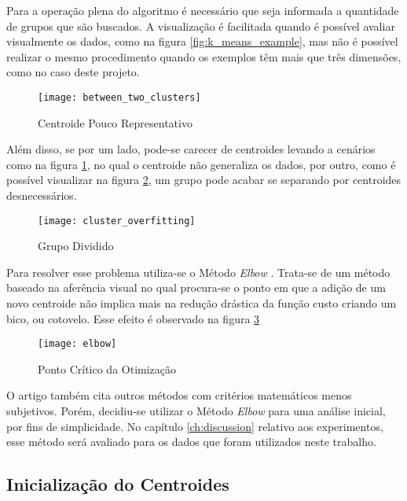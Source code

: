 Para a operação plena do algoritmo é necessário que seja informada a quantidade de grupos que são buscados. A visualização é facilitada quando é possível avaliar visualmente os dados, como na figura \ref{fig:k_means_example}, mas não é possível realizar o mesmo procedimento quando os exemplos têm mais que três dimensões, como no caso deste projeto.

\begin{figure}
\texttt{[image: between\_two\_clusters]}
\caption[Centroide Pouco Representativo]{Centroide Pouco Representativo} \label{fig:between_two_clusters}
\end{figure}

Além disso, se por um lado, pode-se carecer de centroides levando a cenários como na figura \ref{fig:between_two_clusters}, no qual o centroide não generaliza os dados, por outro, como é possível visualizar na figura \ref{fig:cluster_overfitting}, um grupo pode acabar se separando por centroides desnecessários.

\begin{figure}[htbp]
\centering
\texttt{[image: cluster\_overfitting]}
\caption[Grupo Dividido]{Grupo Dividido} \label{fig:cluster_overfitting}
\end{figure}

Para resolver esse problema utiliza-se o Método \textit{Elbow} \citep{kodinariya2013review}. Trata-se de um método baseado na aferência visual no qual procura-se o ponto em que a adição de um novo centroide não implica mais na redução drástica da função custo criando um bico, ou cotovelo. Esse efeito é observado na figura \ref{fig:elbow}

\begin{figure}[htbp]
\centering
\texttt{[image: elbow]}
\caption[Ponto Crítico da Otimização]{Ponto Crítico da Otimização} \label{fig:elbow}
\end{figure}

O artigo \citet{kodinariya2013review} também cita outros métodos com critérios matemáticos menos subjetivos. Porém, decidiu-se utilizar o Método \textit{Elbow} para uma análise inicial, por fins de simplicidade. No capítulo \ref{ch:discussion} relativo aos experimentos, esse método será avaliado para os dados que foram utilizados neste trabalho.

\subsection{Inicialização do Centroides}

